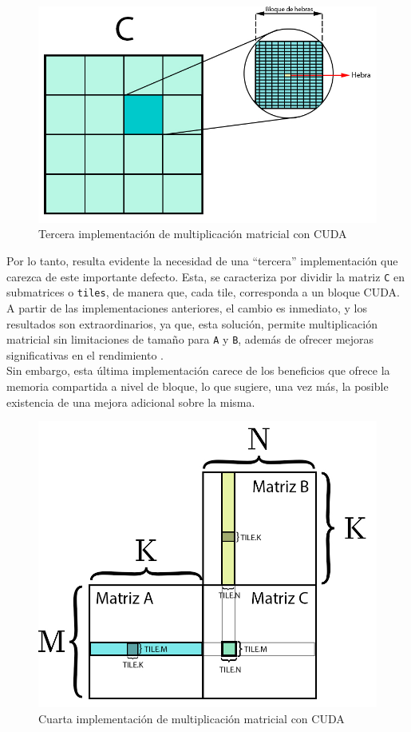 \begin{figure}[H]
	\centering
	\includegraphics[scale=0.3]{imagenes/gemm_tile_v3.jpg}  
	\caption{Tercera implementación de multiplicación matricial con CUDA}
	\label{fig:mult_matrix_cuda_v3}
\end{figure}

Por lo tanto, resulta evidente la necesidad de una ``tercera'' implementación que carezca de este importante defecto. Esta, se caracteriza por dividir la matriz \texttt{C} en submatrices o \texttt{tiles}, de manera que, cada tile, corresponda a un bloque CUDA. A partir de las implementaciones anteriores, el cambio es inmediato, y los resultados son extraordinarios, ya que, esta solución, permite multiplicación matricial sin limitaciones de tamaño para \texttt{A} y \texttt{B}, además de ofrecer mejoras significativas en el rendimiento \cite{cuda_mult_matrix_v3}. \\
Sin embargo, esta última implementación carece de los beneficios que ofrece la memoria compartida a nivel de bloque, lo que sugiere, una vez más, la posible existencia de una mejora adicional sobre la misma. \\

\begin{figure}[H]
	\centering
	\includegraphics[scale=0.3]{imagenes/gemm_tile_v4.jpg}  
	\caption{Cuarta implementación de multiplicación matricial con CUDA}
	\label{fig:mult_matrix_cuda_v4}
\end{figure}


